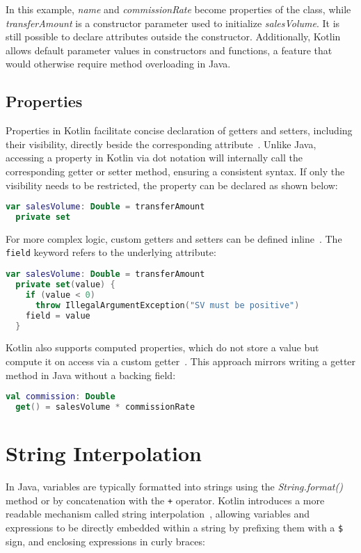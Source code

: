 \documentclass[a4paper,11pt]{article}
\begin{document}
In this example, \textit{name} and \textit{commissionRate} become properties of the class, while \textit{transferAmount} is a constructor parameter used to initialize \textit{salesVolume}. It is still possible to declare attributes outside the constructor. Additionally, Kotlin allows default parameter values in constructors and functions, a feature that would otherwise require method overloading in Java.

\subsection{Properties}
Properties in Kotlin facilitate concise declaration of getters and setters, including their visibility, directly beside the corresponding attribute~\cite{declaring-properties,properties-getters-setters}. Unlike Java, accessing a property in Kotlin via dot notation will internally call the corresponding getter or setter method, ensuring a consistent syntax.
If only the visibility needs to be restricted, the property can be declared as shown below:

\begin{lstlisting}[language=Kotlin, title={Private setter}]
var salesVolume: Double = transferAmount
  private set
\end{lstlisting}

For more complex logic, custom getters and setters can be defined inline~\cite{properties-getters-setters}. The \texttt{field} keyword refers to the underlying attribute:

\begin{lstlisting}[language=Kotlin, title={Custom accessors}]
var salesVolume: Double = transferAmount
  private set(value) {
    if (value < 0)
      throw IllegalArgumentException("SV must be positive")
    field = value
  }
\end{lstlisting}

Kotlin also supports computed properties, which do not store a value but compute it on access via a custom getter~\cite{properties-getters-setters}. This approach mirrors writing a getter method in Java without a backing field:

\begin{lstlisting}[language=Kotlin, title={Computed Property}]
val commission: Double
  get() = salesVolume * commissionRate
\end{lstlisting}

\section{String Interpolation}
In Java, variables are typically formatted into strings using the \textit{String.format()} method or by concatenation with the \texttt{+} operator. Kotlin introduces a more readable mechanism called string interpolation~\cite{string-concatenation}, allowing variables and expressions to be directly embedded within a string by prefixing them with a \texttt{\$} sign, and enclosing expressions in curly braces:
\end{document}
